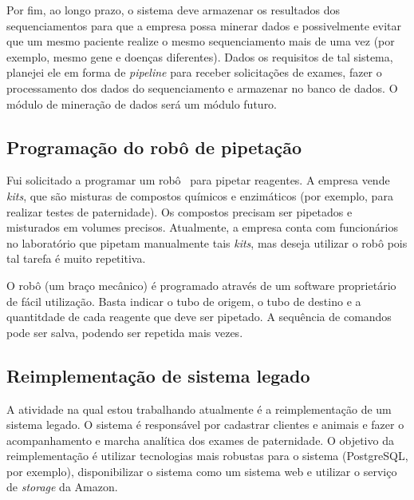 Por fim, ao longo prazo, o sistema deve armazenar os resultados dos sequenciamentos para que a empresa possa minerar dados e possivelmente
evitar que um mesmo paciente realize o mesmo sequenciamento mais de uma vez (por exemplo, mesmo gene e doenças diferentes). Dados os requisitos 
de tal sistema, planejei ele em forma de \textit{pipeline} para receber solicitações de exames, fazer o processamento dos dados do 
sequenciamento e armazenar no banco de dados. O módulo de mineração de dados será um módulo futuro.

\subsection{Programação do robô de pipetação}

Fui solicitado a programar um robô~\cite{Arise} para pipetar reagentes. A empresa vende \textit{kits}, que são misturas de compostos
químicos e enzimáticos (por exemplo, para realizar testes de paternidade). Os compostos precisam ser pipetados e misturados em volumes precisos.
Atualmente, a empresa conta com funcionários no laboratório que pipetam manualmente tais \textit{kits}, mas deseja utilizar o robô pois tal tarefa
é muito repetitiva.

O robô (um braço mecânico) é programado através de um software proprietário de fácil utilização. Basta indicar o tubo de origem, o tubo de destino e a quantitdade
de cada reagente que deve ser pipetado. A sequência de comandos pode ser salva, podendo ser repetida mais vezes.

\subsection{Reimplementação de sistema legado}

A atividade na qual estou trabalhando atualmente é a reimplementação de um sistema legado. O sistema é responsável por cadastrar clientes e 
animais e fazer o acompanhamento e marcha analítica dos exames de paternidade. O objetivo da reimplementação é utilizar tecnologias mais robustas para o sistema
(PostgreSQL, por exemplo), disponibilizar o sistema como um sistema web e utilizar o serviço de \textit{storage} da Amazon.



